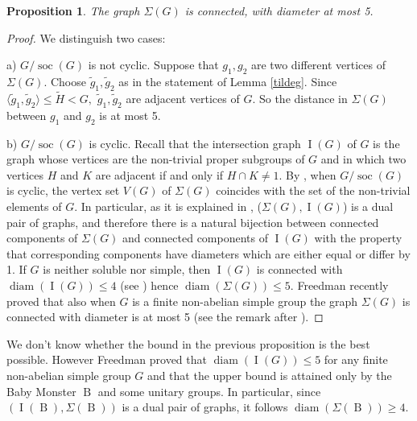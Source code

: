 \documentclass{amsart}
\DeclareMathOperator{\soc}{soc}
\DeclareMathOperator{\diam}{diam}
\DeclareMathOperator{\B}{B}
\DeclareMathOperator{\I}{I}
\newtheorem{prop}[thm]{Proposition} \newtheorem{rem}[thm]{Remark}
\numberwithin{equation}{section}
\begin{document}
\begin{prop}\label{unso}The graph $\Sigma(G)$ is connected, with diameter at most 5.
\end{prop}

\begin{proof}
	We distinguish two cases:

\noindent a) $G/\soc(G)$ is not cyclic.
Suppose that $g_1, g_2$ are two different vertices of $\Sigma(G).$
Choose $\tilde g_1, \tilde g_2$ as in the statement of Lemma \ref{tildeg}. Since $\langle \tilde g_1, \tilde g_2 \rangle \leq \tilde H < G,$ $\tilde g_1, \tilde g_2$ are adjacent vertices of $G$. So the distance in $\Sigma(G)$ between $g_1$ and $g_2$ is at most 5.

\noindent b) $G/\soc(G)$ is cyclic.
Recall that the intersection graph  $\I(G)$ of $G$ is the graph whose vertices are the non-trivial proper subgroups of $G$ and in which two vertices $H$ and $K$ are adjacent if and only if $H\cap K\neq 1.$ 
 By \cite[Theorem 1]{bgh}, when $G/\soc(G)$ is cyclic, the vertex set $V(G)$ of $\Sigma(G)$ coincides with the set of the non-trivial elements of $G$. In particular, as it is explained in \cite[Section 12]{cam},
($\Sigma(G), \I(G)$)  is a dual pair of graphs, and therefore there is a natural
bijection between connected components of $\Sigma(G)$ and connected components of
$\I(G)$ with the property that corresponding components have diameters which are
either equal or differ by 1.
If $G$ is neither soluble nor simple, then 
$\I(G)$ is connected with $\diam(\I(G))\leq 4$ (see \cite[Lemma 5]{she}) hence $\diam(\Sigma(G))\leq 5$.
Freedman recently proved that also when $G$ is a finite non-abelian simple group
the graph $\Sigma(G)$ is connected
with diameter  is at most 5 (see the remark after \cite[Proposition 12]{cam}).
\end{proof}

We don't know whether the bound in the previous proposition is the best possible.
However Freedman \cite{free} proved that $\diam(\I(G))\leq 5$ for any finite non-abelian simple group $G$ and that the upper bound is attained only by the Baby Monster $\B$ and
some unitary groups. In particular, since $(\I(\B),\Sigma(\B))$ is a dual pair of graphs, it follows $\diam(\Sigma(\B))\geq 4.$
\end{document}
